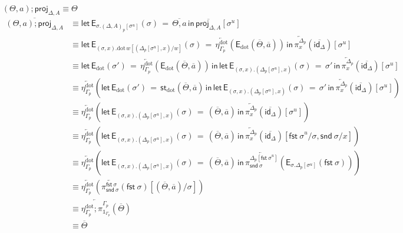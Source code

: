 \documentclass[10pt]{article}
\theoremstyle{definition}
\newcommand\dsd[1]{\ensuremath{\mathsf{#1}}}
\newcommand{\app}[2]{\ensuremath{#1 \: #2}}
\newcommand{\fst}[1]{\app{\dsd{fst}}{#1}}
\newcommand{\snd}[1]{\app{\dsd{snd}}{#1}}
\newcommand{\id}{\mathsf{id}}
\newcommand{\rewrite}[2]{\overleftarrow{#1}(#2)}
\newcommand\StI[2]{\ensuremath{\mathsf{st}_{#1}(#2)}}
\newcommand\EEs[4]{\ensuremath{\mathsf{let} \, \mathsf{E}_{#1}(#3) \, = \, {#2} \, \mathsf{in} \, #4}}
\newcommand\EIs[2]{\ensuremath{\mathsf{E}_{#1}{(#2)}}}
\newcommand\unp[2]{\ensuremath{{#2}^u}}
\newcommand{\modeof}[1]{{#1}_p}
\newcommand{\sdot}{\ensuremath{\mathrm{dot}}}
\newcommand{\upstairs}[1]{\overline{#1}}
\newcommand\proj[1]{\ensuremath{\mathsf{proj}_{#1}}}
\newcommand\One{\ensuremath{\mathds{1}}}
\begin{document}
\begin{enumerate}[style = multiline, labelwidth = 80pt]
\item[{$(\Theta, a);\proj{\Delta,A} \equiv \Theta$}]
\begin{align*}
\upstairs{(\Theta, a);\proj{\Delta,A}}
&\equiv \EEs{\sigma.\modeof{(\Delta,A)}[\unp{\Delta,A}{\sigma}]}{\upstairs{\Theta, a}}{\sigma}{\upstairs{\proj{\Delta,A}}[\unp{\upstairs{\Delta, A}}{\sigma}]} \\
&\equiv \EEs{(\sigma, x). \sdot \, w[(\modeof{\Delta}[\unp{\Delta}{\sigma}], x)/w]}{\rewrite{\eta^\sdot_{\modeof{\Gamma}}}{\EIs{\sdot}{\upstairs{\Theta}, \upstairs{a}}}}{\sigma}{\rewrite{\pi^{\modeof{\Delta}}_x}{\upstairs{\id_\Delta}}[\unp{\upstairs{\Delta, x : A}}{\sigma}]} \\
&\equiv \EEs{\sdot}{\rewrite{\eta^\sdot_{\modeof{\Gamma}}}{\EIs{\sdot}{\upstairs{\Theta}, \upstairs{a}}}}{\sigma'}{\EEs{(\sigma, x). (\modeof{\Delta}[\unp{\Delta}{\sigma}], x)}{\sigma'}{\sigma}{\rewrite{\pi^{\modeof{\Delta}}_x}{\upstairs{\id_\Delta}}[\unp{\upstairs{\Delta, x : A}}{\sigma}]}} \\
&\equiv \rewrite{\eta^\sdot_{\modeof{\Gamma}}}{\EEs{\sdot}{\StI{\sdot}{\upstairs{\Theta}, \upstairs{a}}}{\sigma'}{\EEs{(\sigma, x). (\modeof{\Delta}[\unp{\Delta}{\sigma}], x)}{\sigma'}{\sigma}{\rewrite{\pi^{\modeof{\Delta}}_x}{\upstairs{\id_\Delta}}[\unp{\upstairs{\Delta, x : A}}{\sigma}]}}} \\
&\equiv \rewrite{\eta^\sdot_{\modeof{\Gamma}}}{\EEs{(\sigma, x). (\modeof{\Delta}[\unp{\Delta}{\sigma}], x)}{(\upstairs{\Theta}, \upstairs{a})}{\sigma}{\rewrite{\pi^{\modeof{\Delta}}_x}{\upstairs{\id_\Delta}}[\unp{\upstairs{\Delta, x : A}}{\sigma}]}} \\
&\equiv \rewrite{\eta^\sdot_{\modeof{\Gamma}}}{\EEs{(\sigma, x). (\modeof{\Delta}[\unp{\Delta}{\sigma}], x)}{(\upstairs{\Theta}, \upstairs{a})}{\sigma}{\rewrite{\pi^{\modeof{\Delta}}_x}{\upstairs{\id_\Delta}}[\unp{\upstairs{\Delta}}{\fst \sigma}/\sigma, \snd \sigma / x]}} \\
&\equiv \rewrite{\eta^\sdot_{\modeof{\Gamma}}}{\EEs{(\sigma, x). (\modeof{\Delta}[\unp{\Delta}{\sigma}], x)}{(\upstairs{\Theta}, \upstairs{a})}{\sigma}{\rewrite{\pi^{\modeof{\Delta}[\unp{\upstairs{\Delta}}{\fst \sigma}]}_{\snd \sigma}}{\EIs{\sigma.\modeof{\Delta}[\unp{\Delta}{\sigma}]}{\fst \sigma}}}} \\
&\equiv \rewrite{\eta^\sdot_{\modeof{\Gamma}}}{\rewrite{\pi^{\fst \sigma}_{\snd \sigma}}{\fst \sigma}[(\upstairs{\Theta}, \upstairs{a})/\sigma]} \\
&\equiv \rewrite{\eta^\sdot_{\modeof{\Gamma}};\pi^{\modeof{\Gamma}}_{\One_{\modeof{\Gamma}}}}{\upstairs{\Theta}} \\
&\equiv \upstairs{\Theta}
\end{align*}


\end{enumerate}
\end{document}
